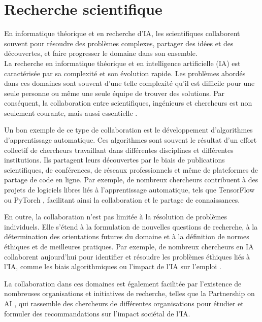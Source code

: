 \section{Recherche scientifique}
En informatique théorique et en recherche d'IA, les scientifiques collaborent souvent pour résoudre des problèmes complexes, partager des idées et des découvertes, et faire progresser le domaine dans son ensemble.\\
La recherche en informatique théorique et en intelligence artificielle (IA) est caractérisée par sa complexité et son évolution rapide. Les problèmes abordés dans ces domaines sont souvent d'une telle complexité qu'il est difficile pour une seule personne ou même une seule équipe de trouver des solutions. Par conséquent, la collaboration entre scientifiques, ingénieurs et chercheurs est non seulement courante, mais aussi essentielle \cite{gupta_collaborative_2019}.

Un bon exemple de ce type de collaboration est le développement d'algorithmes d'apprentissage automatique. Ces algorithmes sont souvent le résultat d'un effort collectif de chercheurs travaillant dans différentes disciplines et différentes institutions. Ils partagent leurs découvertes par le biais de publications scientifiques, de conférences, de réseaux professionnels et même de plateformes de partage de code en ligne. Par exemple, de nombreux chercheurs contribuent à des projets de logiciels libres liés à l'apprentissage automatique, tels que TensorFlow \cite{abadi_tensorflow:_2016} ou PyTorch \cite{paszke_pytorch:_2019}, facilitant ainsi la collaboration et le partage de connaissances.

En outre, la collaboration n'est pas limitée à la résolution de problèmes individuels. Elle s'étend à la formulation de nouvelles questions de recherche, à la détermination des orientations futures du domaine et à la définition de normes éthiques et de meilleures pratiques. Par exemple, de nombreux chercheurs en IA collaborent aujourd'hui pour identifier et résoudre les problèmes éthiques liés à l'IA, comme les biais algorithmiques ou l'impact de l'IA sur l'emploi \cite{jobin_artificial_2019}.

La collaboration dans ces domaines est également facilitée par l'existence de nombreuses organisations et initiatives de recherche, telles que la Partnership on AI \cite{partnership_on_ai}, qui rassemble des chercheurs de différentes organisations pour étudier et formuler des recommandations sur l'impact sociétal de l'IA.

